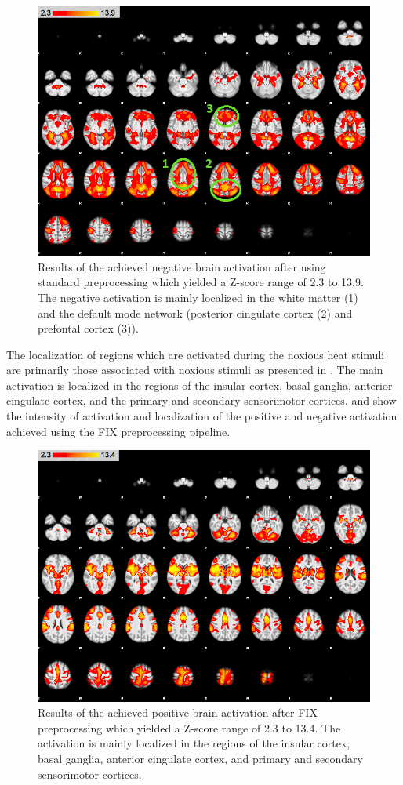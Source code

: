 \begin{figure}[H]                 
	\includegraphics[width=.65\textwidth]{figures/Results/STD_neg_1}  
	\caption{Results of the achieved negative brain activation after using standard preprocessing which yielded a Z-score range of 2.3 to 13.9. The negative activation is mainly localized in the white matter (1) and the default mode network (posterior cingulate cortex (2) and prefontal cortex (3)).}
	\label{fig:res:stdneg} 
\end{figure}

The localization of regions which are activated during the noxious heat stimuli are primarily those associated with noxious stimuli as presented in . The main activation is localized in the regions of the insular cortex, basal ganglia, anterior cingulate cortex, and the primary and secondary sensorimotor cortices. %
 and  show the intensity of activation and localization of the positive and negative activation achieved using the FIX preprocessing pipeline. 

\begin{figure}[H]                 
	\includegraphics[width=.65\textwidth]{figures/Results/FIX_pos}  
	\caption{Results of the achieved positive brain activation after FIX preprocessing which yielded a Z-score range of 2.3 to 13.4. The activation is mainly localized in the regions of the insular cortex, basal ganglia, anterior cingulate cortex, and primary and secondary sensorimotor cortices.}
	\label{fig:res:FIXpos} 
\end{figure}

